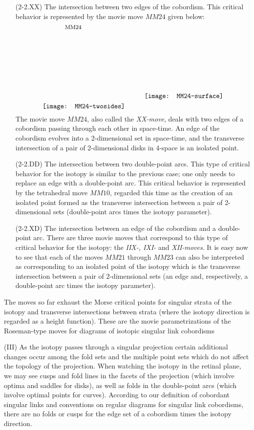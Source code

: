 \documentclass{amsart}\usepackage{amsfonts, amsmath, amssymb}\usepackage{graphicx, epic, epsf, enumerate, stmaryrd}
\theoremstyle{definition}
\numberwithin{equation}{section}
\begin{document}
\begin{enumerate}
\item[(2-2.XX)] The intersection between two edges of the cobordism. This critical behavior is represented by the movie move $MM24$ given below:
\[\put(33, 116){\fontsize{8}{8}$\text{MM24}$}
\raisebox{0pt}{\texttt{[image: MM24-twosides]}} \hspace{1cm} \raisebox{15pt}{\texttt{[image: MM24-surface]}} 
 \]
The movie move $MM24$, also called the \textit{XX-move}, deals with two edges of a cobordism passing through each other in space-time. An edge of the cobordism evolves into a 2-dimensional set in space-time, and the transverse intersection of a pair of 2-dimensional disks in 4-space is an isolated point.

\item[(2-2.DD)] The intersection between two double-point arcs. This type of critical behavior for the isotopy is similar to the previous case; one only needs to replace an edge with a double-point arc. This  critical behavior is represented by the tetrahedral move $MM10$, regarded this time as the creation of an isolated point formed as the transverse intersection between a pair of 2-dimensional sets (double-point arcs times the isotopy parameter).

\item[(2-2.XD)] The intersection between an edge of the cobordism and a double-point arc. There are three movie moves that correspond to this type of critical behavior for the isotopy: the \textit{IIX-, IXI-} and \textit{XII-moves}. It is easy now to see that each of the moves $MM21$ through $MM23$ can also be interpreted as corresponding to an isolated point of the isotopy which is the transverse intersection between a pair of 2-dimensional sets (an edge and, respectively, a double-point arc times the isotopy parameter).
\end{enumerate}

The moves so far exhaust the Morse critical points for singular strata of the isotopy and transverse intersections between strata (where the isotopy direction is regarded as a height function). These are the movie parametrizations of the Roseman-type moves for diagrams of isotopic singular link cobordisms

(III)  As the isotopy passes through a singular projection certain additional changes occur among the fold sets and the multiple point sets which do not affect the topology of the projection. When watching the isotopy in the retinal plane, we may see cusps and fold lines in the facets of the projection (which involve optima and saddles for disks), as well as folds in the double-point arcs (which involve optimal points for curves). According to our definition of cobordant singular links and conventions on regular diagrams for singular link cobordisms, there are no folds or cusps for the edge set of a cobordism times the isotopy direction. 
\end{document}
